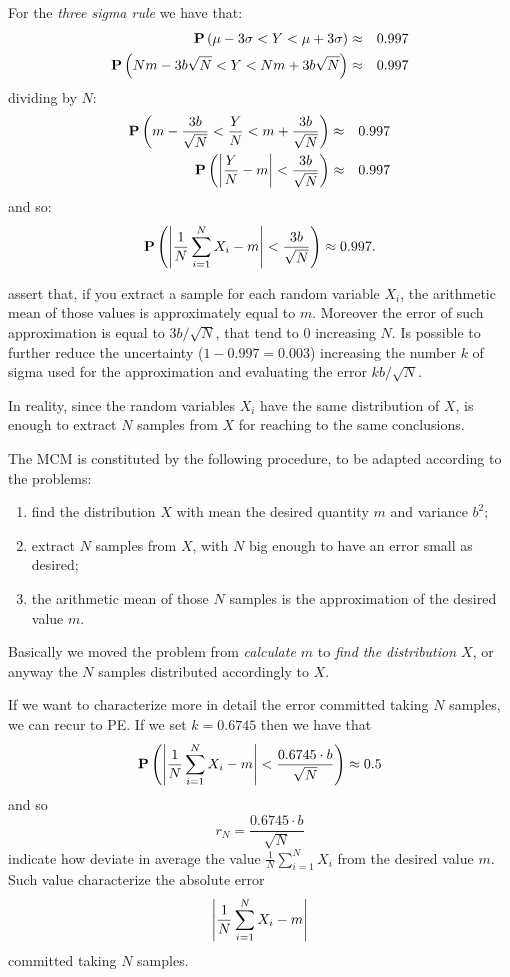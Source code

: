 \documentclass[dissertation.tex]{subfiles}
\begin{document}
For the \emph{three sigma rule} we have that:
\begin{eqnarray*}
  \mathrm{\textbf{P}}\left(\mu-3\sigma < Y <\mu +3\sigma\right)&\approx& 0.997\\
  \mathrm{\textbf{P}}\left(Nm-3b\sqrt{N} < Y < Nm+3b\sqrt{N}\right)&\approx& 0.997
\end{eqnarray*}
dividing by $N$:
\begin{eqnarray*}
  \mathrm{\textbf{P}}\left(m-\frac{3b}{\sqrt{N}} < \frac{Y}{N} <
    m+\frac{3b}{\sqrt{N}}\right)&\approx& 0.997\\
  \mathrm{\textbf{P}}\left(\left|\frac{Y}{N}-m\right| <\frac{3b}{\sqrt{N}}\right)&\approx& 0.997
\end{eqnarray*}
and so:
\begin{equation}\label{eq:mc}
  \mathrm{\textbf{P}}\left(\left|\frac{1}{N}\sum_{i=1}^NX_i-m\right| <\frac{3b}{\sqrt{N}}\right)\approx 0.997.
\end{equation}

 assert that, if you extract a sample for each random
variable $X_i$, the arithmetic mean of those values is approximately
equal to $m$. Moreover the error of such approximation is equal to
$3b/\sqrt{N}$, that tend to $0$ increasing $N$. Is possible to further
reduce the uncertainty ($1-0.997=0.003$) increasing the number $k$ of
sigma used for the
approximation and evaluating the error $kb/\sqrt{N}$.

In reality, since the random variables $X_i$ have the same
distribution of $X$, is enough to extract $N$ samples from $X$ for
reaching to the same conclusions.

The \ac{MCM} is constituted by the following procedure, to be adapted
according to the problems:
\begin{enumerate}
\item find the distribution $X$ with mean the desired quantity $m$ and
  variance $b^2$;
\item extract $N$ samples from $X$, with $N$ big enough to have an
  error small as desired;
\item the arithmetic mean of those $N$ samples is the approximation of
  the desired value $m$.
\end{enumerate}
Basically we moved the problem from \emph{calculate $m$} to \emph{find
  the distribution $X$}, or anyway the $N$ samples distributed
accordingly to $X$.

If we want to characterize more in detail the error committed taking
$N$ samples, we can recur to \ac{PE}. If we set $k=0.6745$ then we
have that
\begin{equation*}
  \mathrm{\textbf{P}}\left(\left|\frac{1}{N}\sum_{i=1}^NX_i-m\right| <\frac{0.6745\cdot b}{\sqrt{N}}\right)\approx 0.5
\end{equation*}
and so
\begin{equation*}
  r_N = \frac{0.6745\cdot b}{\sqrt{N}}
\end{equation*}
indicate how deviate in average the value $\frac{1}{N}\sum_{i=1}^NX_i$
from the desired value $m$. Such value characterize the absolute error
\begin{equation*}
\left|\frac{1}{N}\sum_{i=1}^NX_i-m\right|  
\end{equation*}
committed taking $N$ samples.
\end{document}
